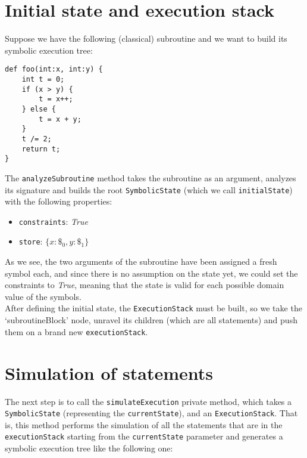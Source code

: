 \documentclass[12pt,a4paper]{report}
\theoremstyle{definition}
\theoremstyle{definition}
\theoremstyle{definition}
\begin{document}
\section{Initial state and execution stack}
Suppose we have the following (classical) subroutine and we want to build its symbolic execution tree:
\begin{lstlisting}
def foo(int:x, int:y) {
    int t = 0;
    if (x > y) {
        t = x++;
    } else {
        t = x + y;
    }
    t /= 2;
    return t;
}
\end{lstlisting}
The \texttt{analyzeSubroutine} method takes the subroutine as an argument, analyzes its signature and builds the root \texttt{SymbolicState} (which we call \texttt{initialState}) with the following properties:
\begin{itemize}
    \itemsep 0em
    \item \texttt{constraints}: \textit{True}
    \item \texttt{store}: $\{x: \$_0, y: \$_1\}$
\end{itemize}
As we see, the two arguments of the subroutine have been assigned a fresh symbol each, and since there is no assumption on the state yet, we could set the constraints to \textit{True}, meaning that the state is valid for each possible domain value of the symbols.\\
After defining the initial state, the \texttt{ExecutionStack} must be built, so we take the `subroutineBlock' node, unravel its children (which are all statements) and push them on a brand new \texttt{executionStack}.\\

\section{Simulation of statements}
The next step is to call the \texttt{simulateExecution} private method, which takes a \texttt{SymbolicState} (representing the \texttt{currentState}), and an \texttt{ExecutionStack}. That is, this method performs the simulation of all the statements that are in the \texttt{executionStack} starting from the \texttt{currentState} parameter and generates a symbolic execution tree like the following one:\\
\end{document}
